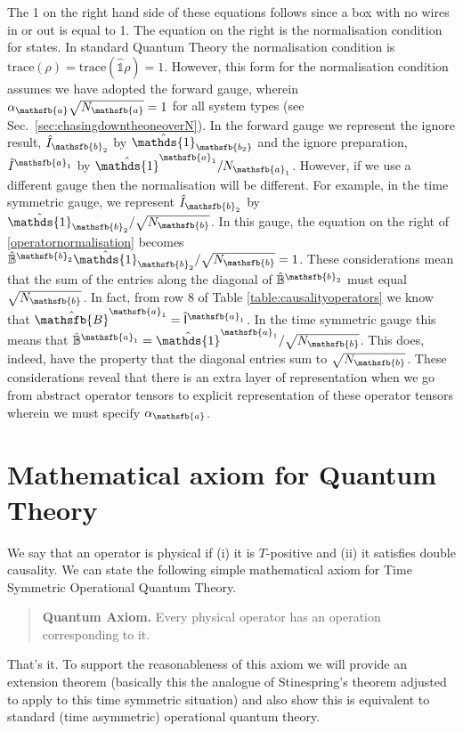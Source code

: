\documentclass[10pt]{article}
\begin{document}
The 1 on the right hand side of these equations follows since a box with no wires in or out is equal to 1.  The equation on the right is the normalisation condition for states.   In standard Quantum Theory the normalisation condition is $\text{trace}(\rho)=\text{trace}(\hat{\mathds{1}}\rho)=1$.  However, this form for the normalisation condition assumes we have adopted the forward gauge, wherein $\alpha_\mathsfb{a}\sqrt{N_\mathsfb{a}}=1$ for all system types (see Sec.\ \ref{sec:chasingdowntheoneoverN}).  In the forward gauge we represent the ignore result, $\hat{I}_{\mathsfb{b}_2}$ by $\hat{\mathds{1}}_\mathsfb{b_2}$ and the ignore preparation, $\hat{I}^{\mathsfb{a}_1}$ by $\hat{\mathds{1}}^{\mathsfb{a}_1}/N_{\mathsfb{a}_1}$.  However, if we use a different gauge then the normalisation will be different.  For example, in the time symmetric gauge, we represent $\hat{I}_{\mathsfb{b}_2}$ by $\hat{\mathds{1}}_{\mathsfb{b}_2}/\sqrt{N_\mathsfb{b}}$.  In this gauge, the equation on the right of \eqref{operatornormalisation} becomes $\hat{\mathbb{B}}^{\mathsfb{b}_2} \hat{\mathds{1}}_{\mathsfb{b}_2}/\sqrt{N_\mathsfb{b}} = 1$.  These considerations mean that the sum of the entries along the diagonal of $\hat{\mathbb{B}}^{\mathsfb{b}_2}$ must equal $\sqrt{N_\mathsfb{b}}$.  In fact, from row 8 of Table \ref{table:causalityoperators} we know that $\hat{\mathsfb{B}}^{\mathsfb{a}_1}=\hat{\mathsf{I}}^{\mathsfb{a}_1}$.  In the time symmetric gauge this means that $\hat{\mathbb{B}}^{\mathsfb{a}_1}=\hat{\mathds{1}}^{\mathsfb{a}_1}/\sqrt{N_\mathsfb{b}}$.  This does, indeed, have the property that the diagonal entries sum to $\sqrt{N_\mathsfb{b}}$.    These considerations reveal that there is an extra layer of representation when we go from abstract operator tensors to explicit representation of these operator tensors wherein we must specify $\alpha_\mathsfb{a}$.

\section{Mathematical axiom for Quantum Theory}\label{sec:mathematicalaxiomforquantumtheory}


We say that an operator is physical if (i) it is $T$-positive and (ii) it satisfies double causality.  We can state the following simple mathematical axiom for Time Symmetric Operational Quantum Theory.
\begin{quote}
\textbf{Quantum Axiom.}
Every physical operator has an operation corresponding to it.
\end{quote}
That's it.  To support the reasonableness of this axiom we will provide an extension theorem (basically this the analogue of Stinespring's theorem adjusted to apply to this time symmetric situation) and also show this is equivalent to standard (time asymmetric) operational quantum theory.
\end{document}
